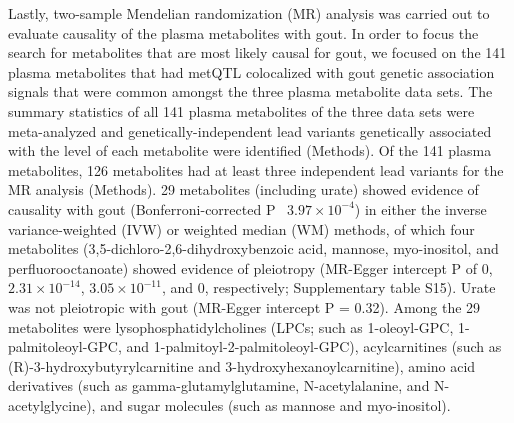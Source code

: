\documentclass[a4paper,10pt]{article}
\begin{document}
Lastly, two-sample Mendelian randomization (MR) analysis was carried out to evaluate causality of the plasma metabolites with gout.
In order to focus the search for metabolites that are most likely causal for gout, we focused on the 141 plasma metabolites that had metQTL colocalized with gout genetic association signals that were common amongst the three plasma metabolite data sets.
The summary statistics of all 141 plasma metabolites of the three data sets were meta-analyzed and genetically-independent lead variants genetically associated with the level of each metabolite were identified (Methods).
Of the 141 plasma metabolites, 126 metabolites had at least three independent lead variants for the MR analysis (Methods).
29 metabolites (including urate) showed evidence of causality with gout (Bonferroni-corrected P \le\ $3.97\times10^{-4}$) in either the inverse variance-weighted (IVW) or weighted median (WM) methods, of which four metabolites (3,5-dichloro-2,6-dihydroxybenzoic acid, mannose, myo-inositol, and perfluorooctanoate) showed evidence of pleiotropy (MR-Egger intercept P of 0, $2.31\times10^{-14}$, $3.05\times10^{-11}$, and 0, respectively; Supplementary table S15).
Urate was not pleiotropic with gout (MR-Egger intercept P = 0.32).
Among the 29 metabolites were lysophosphatidylcholines (LPCs; such as 1-oleoyl-GPC, 1-palmitoleoyl-GPC, and 1-palmitoyl-2-palmitoleoyl-GPC), acylcarnitines (such as (R)-3-hydroxybutyrylcarnitine and 3-hydroxyhexanoylcarnitine), amino acid derivatives (such as gamma-glutamylglutamine, N-acetylalanine, and N-acetylglycine), and sugar molecules (such as mannose and myo-inositol).
\\
\end{document}
